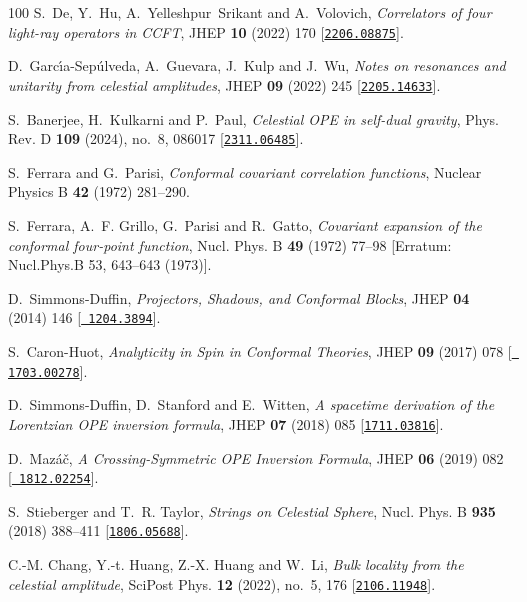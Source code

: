\begin{thebibliography}{100}
S.~De, Y.~Hu, A.~Yelleshpur~Srikant and A.~Volovich,  {\em {Correlators of four
  light-ray operators in CCFT}}, JHEP {\bf 10} (2022) 170
  [\href{http://www.arXiv.org/abs/2206.08875}{{\tt 2206.08875}}].

D.~Garc\'\i{}a-Sep\'ulveda, A.~Guevara, J.~Kulp and J.~Wu,  {\em {Notes on
  resonances and unitarity from celestial amplitudes}}, JHEP {\bf 09} (2022)
  245 [\href{http://www.arXiv.org/abs/2205.14633}{{\tt 2205.14633}}].

S.~Banerjee, H.~Kulkarni and P.~Paul,  {\em {Celestial OPE in self-dual
  gravity}}, Phys. Rev. D {\bf 109} (2024), no.~8, 086017
  [\href{http://www.arXiv.org/abs/2311.06485}{{\tt 2311.06485}}].

S.~Ferrara and G.~Parisi,  {\em Conformal covariant correlation functions},
  Nuclear Physics B {\bf 42} (1972) 281--290.

S.~Ferrara, A.~F. Grillo, G.~Parisi and R.~Gatto,  {\em {Covariant expansion of
  the conformal four-point function}}, Nucl. Phys. B {\bf 49} (1972) 77--98
  [Erratum: Nucl.Phys.B 53, 643--643 (1973)].

D.~Simmons-Duffin,  {\em {Projectors, Shadows, and Conformal Blocks}}, JHEP
  {\bf 04} (2014) 146 [\href{http://www.arXiv.org/abs/1204.3894}{{\tt
  1204.3894}}].

S.~Caron-Huot,  {\em {Analyticity in Spin in Conformal Theories}}, JHEP {\bf
  09} (2017) 078 [\href{http://www.arXiv.org/abs/1703.00278}{{\tt
  1703.00278}}].

D.~Simmons-Duffin, D.~Stanford and E.~Witten,  {\em {A spacetime derivation of
  the Lorentzian OPE inversion formula}}, JHEP {\bf 07} (2018) 085
  [\href{http://www.arXiv.org/abs/1711.03816}{{\tt 1711.03816}}].

D.~Maz\'a\v{c},  {\em {A Crossing-Symmetric OPE Inversion Formula}}, JHEP {\bf
  06} (2019) 082 [\href{http://www.arXiv.org/abs/1812.02254}{{\tt
  1812.02254}}].

S.~Stieberger and T.~R. Taylor,  {\em {Strings on Celestial Sphere}}, Nucl.
  Phys. B {\bf 935} (2018) 388--411
  [\href{http://www.arXiv.org/abs/1806.05688}{{\tt 1806.05688}}].

C.-M. Chang, Y.-t. Huang, Z.-X. Huang and W.~Li,  {\em {Bulk locality from the
  celestial amplitude}}, SciPost Phys. {\bf 12} (2022), no.~5, 176
  [\href{http://www.arXiv.org/abs/2106.11948}{{\tt 2106.11948}}].


\end{thebibliography}
